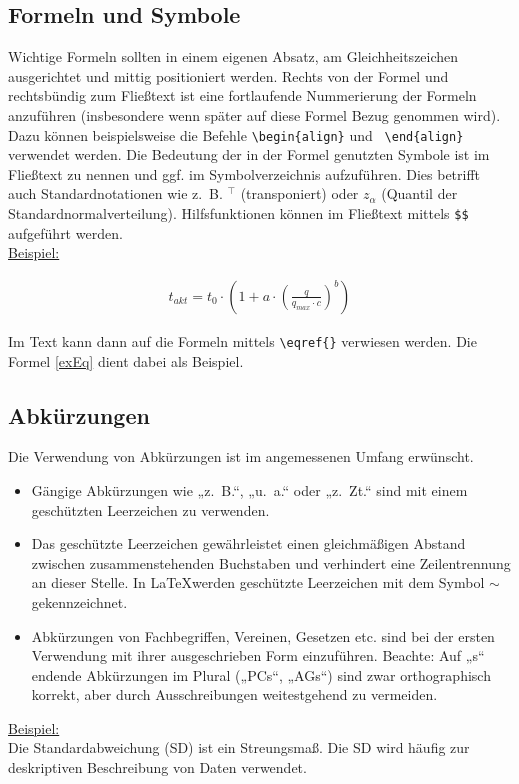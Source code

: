 \subsection{Formeln und Symbole}
Wichtige Formeln sollten in einem eigenen Absatz, am Gleichheitszeichen ausgerichtet und mittig positioniert werden. Rechts von der Formel und rechtsbündig zum Fließtext ist eine fortlaufende Nummerierung der Formeln anzuführen (insbesondere wenn später auf diese Formel Bezug genommen wird). Dazu können beispielsweise die Befehle \verb!\begin{align}! und \verb! \end{align}! verwendet werden. Die Bedeutung der in der Formel genutzten Symbole ist im Fließtext zu nennen und ggf. im Symbolverzeichnis aufzuführen. Dies betrifft auch Standardnotationen wie z.~B. $^\top$  (transponiert) oder $z_{\alpha}$ (Quantil der Standardnormalverteilung). Hilfsfunktionen können im Fließtext mittels \verb!$$! aufgeführt werden.\\
\uline{Beispiel:}

\begin{align}\label{exEq}
    t_{akt}= t_0 \cdot \left( 1+a \cdot\left( \frac{q}{q_{max} \cdot c} \right) ^b \right)
\end{align}

Im Text kann dann auf die Formeln mittels \verb!\eqref{}! verwiesen werden. Die Formel \eqref{exEq} dient dabei als Beispiel.

\subsection{Abkürzungen}
Die Verwendung von Abkürzungen ist im angemessenen Umfang erwünscht. 
\begin{itemize}
    \item Gängige Abkürzungen wie „z.~B.“, „u.~a.“ oder „z.~Zt.“ sind mit einem geschützten Leerzeichen zu verwenden.
    \item Das geschützte Leerzeichen gewährleistet einen gleichmäßigen Abstand zwischen zusammenstehenden Buchstaben und verhindert eine Zeilentrennung an dieser Stelle. In \LaTeX werden geschützte Leerzeichen mit dem Symbol $\sim$ gekennzeichnet. 
    \item Abkürzungen von Fachbegriffen, Vereinen, Gesetzen etc. sind bei der ersten Verwendung mit ihrer ausgeschrieben Form einzuführen. Beachte: Auf „s“ endende Abkürzungen im Plural („PCs“, „AGs“) sind zwar orthographisch korrekt, aber durch Ausschreibungen weitestgehend zu vermeiden.
\end{itemize}
\uline{Beispiel:}
\\
Die Standardabweichung (SD) ist ein Streungsmaß. Die SD wird häufig zur deskriptiven Beschreibung von Daten verwendet.

